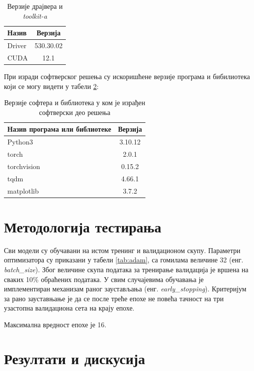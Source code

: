 \documentclass[a4paper, 12pt, master, utf8]{etf}
\begin{document}
\begin{table}[h]
    \centering
    \begin{tabular}{l | c}
    \hline
    Назив & Верзија\\
    \hline
        Driver & 530.30.02\\
        CUDA & 12.1 \\
    \end{tabular}
    \caption{Верзије драјвера и \textit{toolkit-a}}
    \label{tab:hw}
\end{table}

При изради софтверског решења су искоришћене верзије програма и бибилиотека који се могу видети у табели \ref{tab:sw}:
\newline

\begin{table}[h]
    \centering
    \begin{tabular}{l | c}
    \hline
    Назив програма или библиотеке & Верзија\\
    \hline
        Python3 & 3.10.12\\
        torch & 2.0.1\\
        torchvision & 0.15.2\\
        tqdm & 4.66.1\\
        matplotlib & 3.7.2
    \end{tabular}
    \caption{Верзије софтера и библиотека у ком је израђен софтверски део решења}
    \label{tab:sw}
\end{table}

\section{Методологија тестирања}
\label{sec:52}

Сви модели су обучавани на истом тренинг и валидационом скупу. Параметри оптимизатора су приказани у табели \ref{tab:adam}, са гомилама величине 32 (енг. \textit{batch\_size}).
Због величине скупа података за тренирање валидација је вршена на сваких 10\% обраћених података.
У свим случајевима обучавања је имплементиран механизам раног заустављања (енг. \textit{early\_stopping}). Критеријум за рано зауставњање је да се после треће епохе не повећа 
тачност на три узастопна валидациона сета на крају епохе.

Максимална вредност епохе је 16.

\section{Резултати и дискусија}
\label{sec:53}
\end{document}
